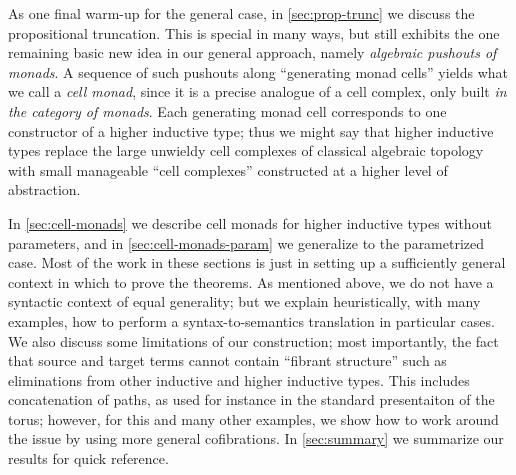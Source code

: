 As one final warm-up for the general case, in \cref{sec:prop-trunc} we discuss the propositional truncation.
This is special in many ways, but still exhibits the one remaining basic new idea in our general approach, namely \emph{algebraic pushouts of monads}.
A sequence of such pushouts along ``generating monad cells'' yields what we call a \emph{cell monad}, since it is a precise analogue of a cell complex, only built \emph{in the category of monads}.
Each generating monad cell corresponds to one constructor of a higher inductive type; thus we might say that higher inductive types replace the large unwieldy cell complexes of classical algebraic topology with small manageable ``cell complexes'' constructed at a higher level of abstraction.

In \cref{sec:cell-monads} we describe cell monads for higher inductive types without parameters, and in \cref{sec:cell-monads-param} we generalize to the parametrized case.
Most of the work in these sections is just in setting up a sufficiently general context in which to prove the theorems.
As mentioned above, we do not have a syntactic context of equal generality; but we explain heuristically, with many examples, how to perform a syntax-to-semantics translation in particular cases.
We also discuss some limitations of our construction; most importantly, the fact that source and target terms cannot contain ``fibrant structure'' such as eliminations from other inductive and higher inductive types.
This includes concatenation of paths, as used for instance in the standard presentaiton of the torus; however, for this and many other examples, we show how to work around the issue by using more general cofibrations.
In \cref{sec:summary} we summarize our results for quick reference.


